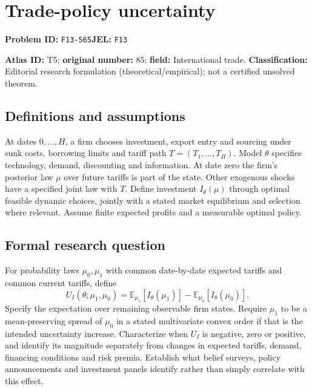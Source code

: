 \documentclass[11pt,a4paper]{article}
\begin{document}
\section*{Trade-policy uncertainty}
\textbf{Problem ID:} \texttt{F13-565}\quad \textbf{JEL:} \texttt{F13}\par
\label{problem:OP-0085}
\label{atlas:prob:T5}

\noindent\textbf{Atlas ID:} T5; \textbf{original number:} 85; \textbf{field:} International trade. \textbf{Classification:} Editorial research formulation (theoretical/empirical); not a certified unsolved theorem.

\subsection*{Definitions and assumptions}
At dates $0,\ldots,H$, a firm chooses investment, export entry and sourcing under sunk costs, borrowing limits and tariff path $T=(T_1,\ldots,T_H)$. Model $\theta$ specifies technology, demand, discounting and information. At date zero the firm’s posterior law $\mu$ over future tariffs is part of the state. Other exogenous shocks have a specified joint law with $T$. Define investment $I_\theta(\mu)$ through optimal feasible dynamic choices, jointly with a stated market equilibrium and selection where relevant. Assume finite expected profits and a measurable optimal policy.

\subsection*{Formal research question}
For probability laws $\mu_0,\mu_1$ with common date-by-date expected tariffs and common current tariffs, define
\[
 U_I(\theta;\mu_1,\mu_0)
 =\mathbb E_{\mu_1}[I_\theta(\mu_1)]
  -\mathbb E_{\mu_0}[I_\theta(\mu_0)].
\]
Specify the expectation over remaining observable firm states. Require $\mu_1$ to be a mean-preserving spread of $\mu_0$ in a stated multivariate convex order if that is the intended uncertainty increase. Characterize when $U_I$ is negative, zero or positive, and identify its magnitude separately from changes in expected tariffs, demand, financing conditions and risk premia. Establish what belief surveys, policy announcements and investment panels identify rather than simply correlate with this effect.
\end{document}
